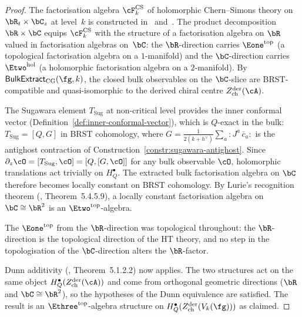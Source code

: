 \begin{proof}
The factorisation algebra $\cF^{\mathrm{CS}}_k$ of holomorphic
Chern--Simons theory on $\bR_t \times \bC_z$ at level~$k$ is
constructed in~\cite{CG17} and~\cite{CG-vol2}. The product
decomposition $\bR \times \bC$ equips $\cF^{\mathrm{CS}}_k$ with
the structure of a factorisation algebra on $\bR$ valued in
factorisation algebras on~$\bC$: the $\bR$-direction
carries $\Eone^{\mathrm{top}}$ (a topological factorisation algebra
on a $1$-manifold) and the $\bC$-direction carries
$\Etwo^{\mathrm{hol}}$ (a holomorphic factorisation algebra on a
$2$-manifold). By
$\mathsf{BulkExtract}_{\mathrm{CG}}(\fg,k)$, the closed bulk
observables on the $\bC$-slice are BRST-compatible and
quasi-isomorphic to the derived chiral centre
$Z^{\mathrm{der}}_{\mathrm{ch}}(\cA)$.

The Sugawara element $T_{\mathrm{Sug}}$ at non-critical level
provides the inner conformal vector
(Definition~\ref{def:inner-conformal-vector}), which is
$Q$-exact in the bulk: $T_{\mathrm{Sug}} = [Q, G]$ in BRST
cohomology, where
$G = \frac{1}{2(k+h^\vee)}\sum_a {:}J^a\,\bar c_a{:}$ is the
antighost contraction of
Construction~\ref{constr:sugawara-antighost}. Since
$\partial_z \cO = [T_{\mathrm{Sug}}, \cO] = [Q, [G, \cO]]$
for any bulk observable $\cO$, holomorphic translations act
trivially on $H_Q^\bullet$. The extracted bulk factorisation
algebra on $\bC$ therefore becomes locally constant on BRST
cohomology.
By Lurie's recognition theorem
(\cite{HA}, Theorem~5.4.5.9), a locally constant factorisation
algebra on $\bC \cong \bR^2$ is an $\Etwo^{\mathrm{top}}$-algebra.

The $\Eone^{\mathrm{top}}$ from the $\bR$-direction was
topological throughout: the $\bR$-direction is the topological
direction of the HT theory, and no step in the topologisation
of the $\bC$-direction alters the $\bR$-factor.

Dunn additivity (\cite{HA}, Theorem~5.1.2.2) now applies.
The two structures act on the same object
$H_Q^\bullet(Z^{\mathrm{der}}_{\mathrm{ch}}(\cA))$
and come from orthogonal geometric directions
($\bR$ and $\bC \cong \bR^2$), so the hypotheses of the
Dunn equivalence are satisfied. The result is an
$\Ethree^{\mathrm{top}}$-algebra structure on
$H_Q^\bullet(Z^{\mathrm{der}}_{\mathrm{ch}}(V_k(\fg)))$
as claimed.
\end{proof}

